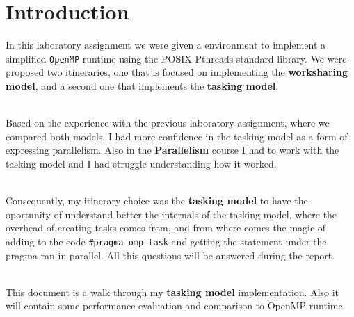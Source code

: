 \section{Introduction}
\par
In this laboratory assignment we were given a environment to implement a simplified \texttt{OpenMP} runtime using the POSIX Pthreads standard library. We were proposed two itineraries, one that is focused on implementing the \textbf{worksharing model}, and a second one that implements the \textbf{tasking model}.

\par ~\\
Based on the experience with the previous laboratory assignment, where we compared both models, I had more confidence in the tasking model as a form of expressing parallelism. Also in the \textbf{Parallelism} course I had to work with the tasking model and I had struggle understanding how it worked. 

\par ~\\
Consequently, my itinerary choice was the \textbf{tasking model} to have the oportunity of understand better the internals of the tasking model, where the overhead of creating tasks comes from, and from where comes the magic of adding to the code \texttt{\#pragma omp task} and getting the statement under the pragma ran in parallel. All this questions will be answered during the report.

\par ~\\
This document is a walk through my \textbf{tasking model} implementation. Also it will contain some performance evaluation and comparison to OpenMP runtime.